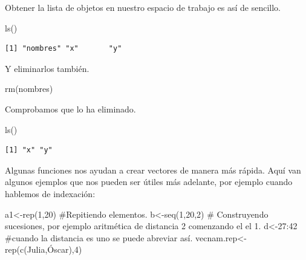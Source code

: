 \documentclass[
  letterpaper,
  DIV=11,
  numbers=noendperiod]{scrreprt}
\newenvironment{Shaded}{\begin{snugshade}}{\end{snugshade}}
\newcommand{\CommentTok}[1]{\textcolor[rgb]{0.37,0.37,0.37}{#1}}
\newcommand{\DecValTok}[1]{\textcolor[rgb]{0.68,0.00,0.00}{#1}}
\newcommand{\FunctionTok}[1]{\textcolor[rgb]{0.28,0.35,0.67}{#1}}
\newcommand{\NormalTok}[1]{\textcolor[rgb]{0.00,0.23,0.31}{#1}}
\newcommand{\OtherTok}[1]{\textcolor[rgb]{0.00,0.23,0.31}{#1}}
\newcommand{\SpecialCharTok}[1]{\textcolor[rgb]{0.37,0.37,0.37}{#1}}
\newcommand{\StringTok}[1]{\textcolor[rgb]{0.13,0.47,0.30}{#1}}
\begin{document}
Obtener la lista de objetos en nuestro espacio de trabajo es así de
sencillo.

\begin{Shaded}
\begin{Highlighting}[]
\FunctionTok{ls}\NormalTok{()}
\end{Highlighting}
\end{Shaded}

\begin{verbatim}
[1] "nombres" "x"       "y"      
\end{verbatim}

Y eliminarlos también.

\begin{Shaded}
\begin{Highlighting}[]
\FunctionTok{rm}\NormalTok{(nombres)}
\end{Highlighting}
\end{Shaded}

Comprobamos que lo ha eliminado.

\begin{Shaded}
\begin{Highlighting}[]
\FunctionTok{ls}\NormalTok{()}
\end{Highlighting}
\end{Shaded}

\begin{verbatim}
[1] "x" "y"
\end{verbatim}

Algunas funciones nos ayudan a crear vectores de manera más rápida. Aquí
van algunos ejemplos que nos pueden ser útiles más adelante, por ejemplo
cuando hablemos de indexación:

\begin{Shaded}
\begin{Highlighting}[]
\NormalTok{a1}\OtherTok{\textless{}{-}}\FunctionTok{rep}\NormalTok{(}\DecValTok{1}\NormalTok{,}\DecValTok{20}\NormalTok{) }\CommentTok{\#Repitiendo elementos.}
\NormalTok{b}\OtherTok{\textless{}{-}}\FunctionTok{seq}\NormalTok{(}\DecValTok{1}\NormalTok{,}\DecValTok{20}\NormalTok{,}\DecValTok{2}\NormalTok{)  }\CommentTok{\# Construyendo sucesiones, por ejemplo aritmética de distancia 2 comenzando el el 1.}
\NormalTok{d}\OtherTok{\textless{}{-}}\DecValTok{27}\SpecialCharTok{:}\DecValTok{42} \CommentTok{\#cuando la distancia es uno se puede abreviar así.}
\NormalTok{vecnam.rep}\OtherTok{\textless{}{-}}\FunctionTok{rep}\NormalTok{(}\FunctionTok{c}\NormalTok{(}\StringTok{\textquotesingle{}Julia\textquotesingle{}}\NormalTok{,}\StringTok{\textquotesingle{}Óscar\textquotesingle{}}\NormalTok{),}\DecValTok{4}\NormalTok{)}
\end{Highlighting}
\end{Shaded}
\end{document}
